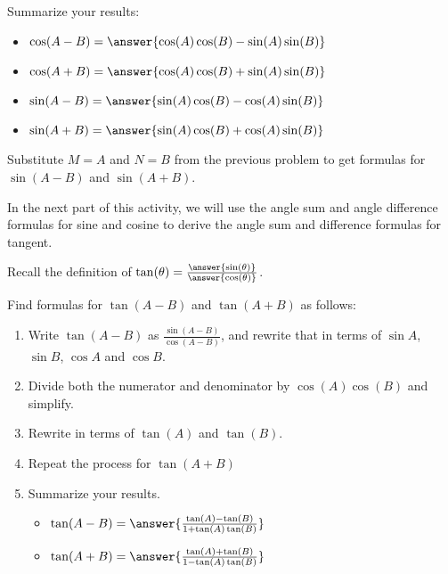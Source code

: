 \documentclass[number]{ximera}
\begin{document}
\begin{problem}
Summarize your results:
\begin{itemize}

\item $\cos(A-B) = \answer{\cos(A)\cos(B)-\sin(A)\sin(B)}$
\item $\cos(A+B) = \answer{\cos(A)\cos(B)+\sin(A)\sin(B)}$
\item $\sin(A-B) = \answer{\sin(A)\cos(B)-\cos(A)\sin(B)}$
\item $\sin(A+B) = \answer{\sin(A)\cos(B)+\cos(A)\sin(B)}$
\end{itemize}
\begin{hint}
Substitute $M=A$ and $N=B$ from the previous problem to get formulas for $\sin(A-B)$ and $\sin(A+B)$.
\end{hint}

\end{problem}


In the next part of this activity, we will use the angle sum and angle difference formulas for sine and cosine to derive the angle sum and difference formulas for tangent.

\begin{problem}
Recall the definition of $\tan(\theta)=\frac{\answer{\sin(\theta)}}{\answer{\cos(\theta)}}$.
\end{problem}

\begin{problem}
Find formulas for $\tan (A-B)$ and $\tan (A+B)$ as follows:

\begin{enumerate}
\item Write $\tan (A-B)$ as $\frac{\sin (A-B)}{\cos (A-B)}$, and rewrite that in terms of $\sin A$, $\sin B$, $\cos A$ and $\cos B$.
\item Divide both the numerator and denominator by $\cos (A) \cos(B)$ and simplify.
\item Rewrite in terms of $\tan (A)$ and $\tan(B)$. 
\item Repeat the process for $\tan (A+B)$
\item Summarize your results.
  \begin{itemize}
  \item $\tan(A-B)=\answer{\frac{\tan(A)-\tan(B)}{1+\tan(A)\tan(B)}}$
  \item $\tan(A+B)=\answer{\frac{\tan(A)+\tan(B)}{1-\tan(A)\tan(B)}}$
  \end{itemize}
\end{enumerate}

\end{problem}
\end{document}
